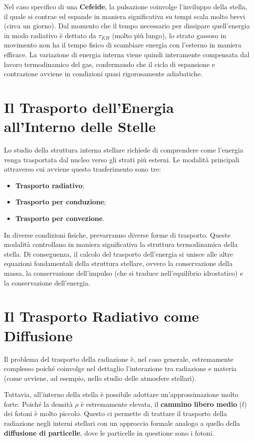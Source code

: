 Nel caso specifico di una \textbf{Cefeide}, la pulsazione coinvolge l'inviluppo della stella, il quale si contrae ed espande in maniera significativa su tempi scala molto brevi (circa un giorno). Dal momento che il tempo necessario per dissipare quell'energia in modo radiativo è dettato da $\tau_{KH}$ (molto più lungo), lo strato gassoso in movimento non ha il tempo fisico di scambiare energia con l'esterno in maniera efficace. La variazione di energia interna viene quindi interamente compensata dal lavoro termodinamico del gas, confermando che il ciclo di espansione e contrazione avviene in condizioni quasi rigorosamente adiabatiche.

\section{Il Trasporto dell'Energia all'Interno delle Stelle}

Lo studio della struttura interna stellare richiede di comprendere come l'energia venga trasportata dal nucleo verso gli strati più esterni. Le modalità principali attraverso cui avviene questo trasferimento sono tre:
\begin{itemize}
\item \textbf{Trasporto radiativo};
\item \textbf{Trasporto per conduzione};
\item \textbf{Trasporto per convezione}.
\end{itemize}
In diverse condizioni fisiche, prevarranno diverse forme di trasporto. Queste modalità controllano in maniera significativa la struttura termodinamica della stella. Di conseguenza, il calcolo del trasporto dell'energia si unisce alle altre equazioni fondamentali della struttura stellare, ovvero la conservazione della massa, la conservazione dell'impulso (che si traduce nell'equilibrio idrostatico) e la conservazione dell'energia.

\section{Il Trasporto Radiativo come Diffusione}

Il problema del trasporto della radiazione è, nel caso generale, estremamente complesso poiché coinvolge nel dettaglio l'interazione tra radiazione e materia (come avviene, ad esempio, nello studio delle atmosfere stellari).

Tuttavia, all'interno della stella è possibile adottare un'approssimazione molto forte. Poiché la densità $\rho$ è estremamente elevata, il \textbf{cammino libero medio} ($l$) dei fotoni è molto piccolo. Questo ci permette di trattare il trasporto della radiazione negli interni stellari con un approccio formale analogo a quello della \textbf{diffusione di particelle}, dove le particelle in questione sono i fotoni.

